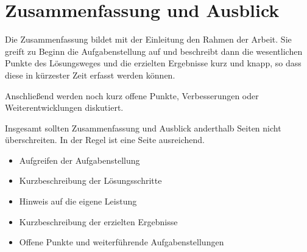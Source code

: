 \chapter{Zusammenfassung und Ausblick}\label{kap:zusammenfassungausblick}
%
Die Zusammenfassung bildet mit der Einleitung den
Rahmen der Arbeit. Sie greift zu Beginn die Aufgabenstellung auf
und beschreibt dann die wesentlichen Punkte des
 Lösungsweges und die erzielten Ergebnisse kurz
  und knapp, so dass diese in kürzester Zeit
   erfasst werden können.

Anschließend werden noch kurz offene Punkte,
 Verbesserungen oder Weiterentwicklungen diskutiert.

Insgesamt sollten Zusammenfassung und
 Ausblick anderthalb Seiten nicht überschreiten.
  In der Regel ist eine Seite ausreichend.

\begin{itemize}
    \item Aufgreifen der Aufgabenstellung
    \item Kurzbeschreibung der Lösungsschritte
    \item Hinweis auf die eigene Leistung
    \item Kurzbeschreibung der erzielten Ergebnisse
    \item Offene Punkte und weiterführende Aufgabenstellungen
\end{itemize}